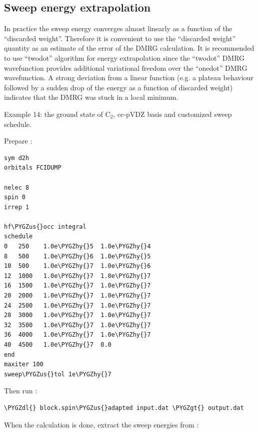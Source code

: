 \documentclass[letterpaper,10pt,english]{sphinxmanual}
\def\PYGZus{\char`\_}
\def\PYGZgt{\char`\>}
\def\PYGZdl{\char`\$}
\def\PYGZhy{\char`\-}
\begin{document}
\subsection{Sweep energy extrapolation}
\label{examples:sweep-energy-extrapolation}
In practice the sweep energy converges almost linearly as a function of the ``discarded weight''.
Therefore it is convenient to use the ``discarded weight'' quantity as an estimate of the error of the DMRG calculation.
It is recommended to use ``twodot'' algorithm for energy extrapolation
since the ``twodot'' DMRG wavefunction provides additional variational freedom over the ``onedot'' DMRG wavefunction.
A strong deviation from a linear function (e.g. a plateau behaviour followed by a sudden drop of the
energy as a function of discarded weight) indicates that the DMRG was stuck in a local minimum.

Example 14: the ground state of C$_{\text{2}}$, cc-pVDZ basis and customized sweep schedule.

Prepare :

\begin{Verbatim}[commandchars=\\\{\}]
sym d2h
orbitals FCIDUMP

nelec 8
spin 0
irrep 1

hf\PYGZus{}occ integral
schedule
0   250    1.0e\PYGZhy{}5  1.0e\PYGZhy{}4
8   500    1.0e\PYGZhy{}6  1.0e\PYGZhy{}5
10  500    1.0e\PYGZhy{}7  1.0e\PYGZhy{}6
12  1000   1.0e\PYGZhy{}7  1.0e\PYGZhy{}7
16  1500   1.0e\PYGZhy{}7  1.0e\PYGZhy{}7
20  2000   1.0e\PYGZhy{}7  1.0e\PYGZhy{}7
24  2500   1.0e\PYGZhy{}7  1.0e\PYGZhy{}7
28  3000   1.0e\PYGZhy{}7  1.0e\PYGZhy{}7
32  3500   1.0e\PYGZhy{}7  1.0e\PYGZhy{}7
36  4000   1.0e\PYGZhy{}7  1.0e\PYGZhy{}7
40  4500   1.0e\PYGZhy{}7  0.0
end
maxiter 100
sweep\PYGZus{}tol 1e\PYGZhy{}7
\end{Verbatim}

Then run :

\begin{Verbatim}[commandchars=\\\{\}]
\PYGZdl{} block.spin\PYGZus{}adapted input.dat \PYGZgt{} output.dat
\end{Verbatim}

When the calculation is done, extract the sweep energies from :
\end{document}
